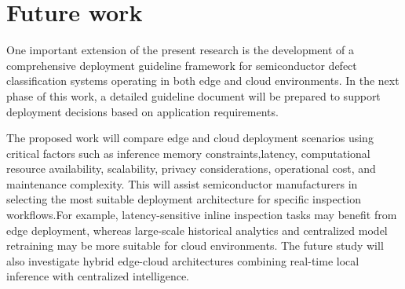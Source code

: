 \chapter{Future work}

One important extension of the present research is the development of a comprehensive deployment guideline framework for semiconductor defect classification systems operating in both edge and cloud environments. In the next phase of this work, a detailed guideline document will be prepared to support deployment decisions based on application requirements.

The proposed work will compare edge and cloud deployment scenarios using critical factors such as inference memory constraints,latency, computational resource availability, scalability, privacy considerations, operational cost, and maintenance complexity. This will assist semiconductor manufacturers in selecting the most suitable deployment architecture for specific inspection workflows.For example, latency-sensitive inline inspection tasks may benefit from edge deployment, whereas large-scale historical analytics and centralized model retraining may be more suitable for cloud environments. The future study will also investigate hybrid edge-cloud architectures combining real-time local inference with centralized intelligence.